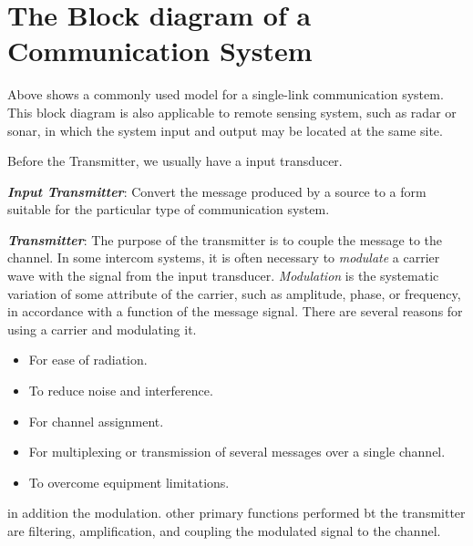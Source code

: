 \documentclass[12pt,a4paper]{book}
\begin{document}
\section{The Block diagram of a Communication System}
Above shows a commonly used model for a single-link communication system. This block diagram is also applicable to remote sensing system, such as radar or sonar, in which the system input and output may be located at the same site.

Before the Transmitter, we usually have a input transducer.

\textbf{\textit{Input Transmitter}}: Convert the message produced by a source to a form suitable for the particular type of communication system.

\textbf{\textit{Transmitter}}: The purpose of the transmitter is to couple the message to the channel. In some intercom systems, it is often necessary to \textit{modulate} a carrier wave with the signal from the input transducer. \textit{Modulation} is the systematic variation of some attribute of the carrier, such as amplitude, phase, or frequency, in accordance with a function of the message signal. There are several reasons for using a carrier and modulating it.
\begin{itemize}
  \item For ease of radiation.
  \item To reduce noise and interference.
  \item For channel assignment.
  \item For multiplexing or transmission of several messages over a single channel.
  \item To overcome equipment limitations.
\end{itemize}
in addition the modulation. other primary functions performed bt the transmitter are filtering, amplification, and coupling the modulated signal to the channel.
\end{document}
